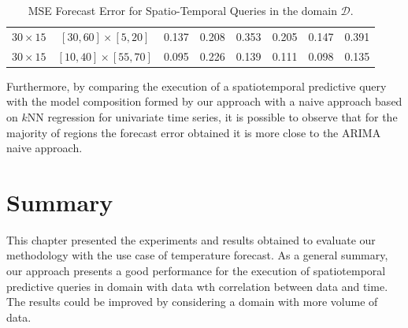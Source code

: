 \begin{table}[h]
\begin{tabular}{|c|c|r|r|r|r|r|r|}
        $30 \times 15$ & $[30, 60] \times [ 5, 20]$ & 0.137 & 0.208 & 0.353 & 0.205 & 0.147 & \cellcolor{red!20}0.391 \\ %
        $30 \times 15$ & $[10, 40] \times [55, 70]$ & 0.095 & 0.226 & 0.139 & 0.111 & 0.098 & \cellcolor{red!20}0.135 \\ %
        \hline
	\end{tabular}
	\caption{MSE Forecast Error for Spatio-Temporal Queries in the domain $\mathcal{D}$.}
	\label{Table:MSEForecasError}
\end{table}

Furthermore, by comparing the execution of a spatiotemporal predictive query with the model composition formed by our approach with a naive approach based on $k$NN regression for univariate time series, it is possible to observe that for the majority of regions the forecast error obtained it is more close to the ARIMA naive approach.

\section{Summary} 

This chapter presented the experiments and results obtained to evaluate our methodology with the use case of temperature forecast. As a general summary, our approach presents a good performance for the execution of spatiotemporal predictive queries in domain with data wth correlation between data and time. The results could be improved by considering a domain with more volume of data.